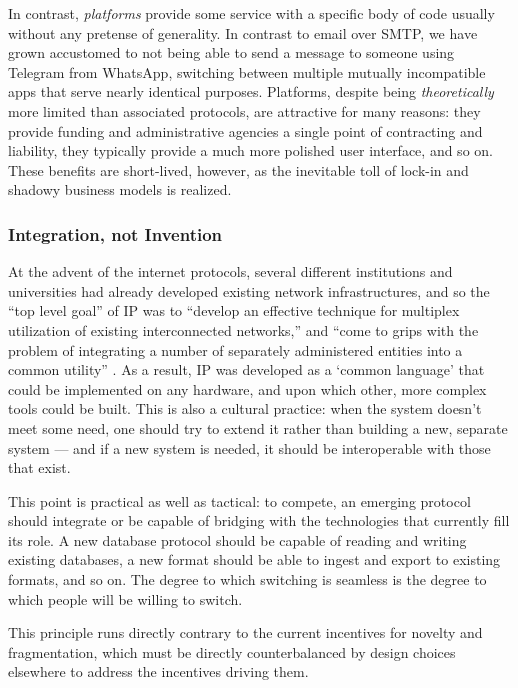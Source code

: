 \documentclass[11pt]{article}
\begin{document}
\begin{multicols}{2}
In contrast, \emph{platforms} provide some service with a specific body
of code usually without any pretense of generality. In contrast to email
over SMTP, we have grown accustomed to not being able to send a message
to someone using Telegram from WhatsApp, switching between multiple
mutually incompatible apps that serve nearly identical purposes.
Platforms, despite being \emph{theoretically} more limited than
associated protocols, are attractive for many reasons: they provide
funding and administrative agencies a single point of contracting and
liability, they typically provide a much more polished user interface,
and so on. These benefits are short-lived, however, as the inevitable
toll of lock-in and shadowy business models is realized.

\hypertarget{integration-not-invention}{%
\subsubsection{Integration, not
Invention}\label{integration-not-invention}}

At the advent of the internet protocols, several different institutions
and universities had already developed existing network infrastructures,
and so the ``top level goal'' of IP was to ``develop an effective
technique for multiplex utilization of existing interconnected
networks,'' and ``come to grips with the problem of integrating a number
of separately administered entities into a common utility'' \cite{clarkDesignPhilosophyDARPA1988} . As a result, IP was developed as a
`common language' that could be implemented on any hardware, and upon
which other, more complex tools could be built. This is also a cultural
practice: when the system doesn't meet some need, one should try to
extend it rather than building a new, separate system --- and if a new
system is needed, it should be interoperable with those that exist.

This point is practical as well as tactical: to compete, an emerging
protocol should integrate or be capable of bridging with the
technologies that currently fill its role. A new database protocol
should be capable of reading and writing existing databases, a new
format should be able to ingest and export to existing formats, and so
on. The degree to which switching is seamless is the degree to which
people will be willing to switch.

This principle runs directly contrary to the current incentives for
novelty and fragmentation, which must be directly counterbalanced by
design choices elsewhere to address the incentives driving them.


\end{multicols}
\end{document}
